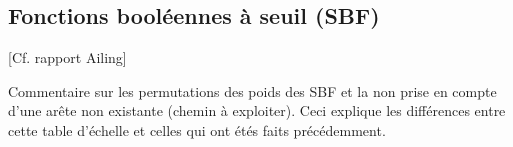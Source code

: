 %

\subsection{Fonctions booléennes à seuil (SBF)}
\label{sec:sbf}

[Cf. rapport Ailing]

Commentaire sur les permutations des poids des SBF et la non prise en compte d'une arête non existante (chemin à exploiter). Ceci explique les différences entre cette table d'échelle et celles qui ont étés faits précédemment. 

